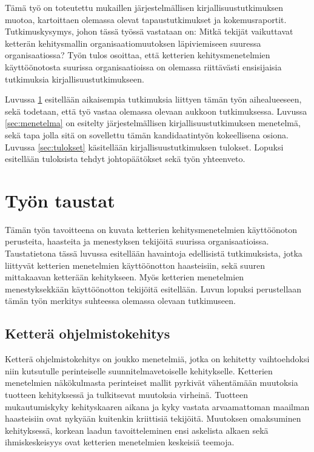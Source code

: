 Tämä työ on toteutettu mukaillen järjestelmällisen kirjallisuustutkimuksen
muotoa, kartoittaen olemassa olevat tapaustutkimukset ja kokemusraportit.
Tutkimuskysymys, johon tässä työssä vastataan on: Mitkä tekijät vaikuttavat
ketterän kehitysmallin organisaatiomuutoksen läpiviemiseen suuressa
organisaatiossa? Työn tulos osoittaa, että ketterien kehitysmenetelmien
käyttöönotosta suurissa organisaatioissa on olemassa riittävästi ensisijaisia
tutkimuksia kirjallisuustutkimukseen.

Luvussa \ref{sec:tausta} esitellään aikaisempia tutkimuksia liittyen tämän työn
aihealueeseen, sekä todetaan, että työ vastaa olemassa olevaan aukkoon
tutkimuksessa. Luvussa \ref{sec:menetelma} on esitelty järjestelmällisen
kirjallisuustutkimuksen menetelmä, sekä tapa jolla sitä on sovellettu tämän
kandidaatintyön kokeellisena osiona. Luvussa \ref{sec:tulokset} käsitellään
kirjallisuustutkimuksen tulokset. Lopuksi esitellään tuloksista tehdyt
johtopäätökset sekä työn yhteenveto.


\clearpage
\section{Työn taustat}
\label{sec:tausta}

Tämän työn tavoitteena on kuvata ketterien kehitysmenetelmien käyttöönoton
perusteita, haasteita ja menestyksen tekijöitä suurissa organisaatioissa.
Taustatietona tässä luvussa esitellään havaintoja edellisistä tutkimuksista,
jotka liittyvät ketterien menetelmien käyttöönotton haasteisiin, sekä suuren
mittakaavan ketterään kehitykseen. Myös ketterien menetelmien menestyksekkään
käyttöönotton tekijöitä esitellään. Luvun lopuksi perustellaan tämän työn
merkitys suhteessa olemassa olevaan tutkimuseen.

\subsection{Ketterä ohjelmistokehitys}

Ketterä ohjelmistokehitys on joukko menetelmiä, jotka on kehitetty vaihtoehdoksi
niin kutsutulle perinteiselle suunnitelmavetoiselle kehitykselle. Ketterien
menetelmien näkökulmasta perinteiset mallit pyrkivät vähentämään muutoksia
tuotteen kehityksessä ja tulkitsevat muutoksia virheinä. Tuotteen
mukautumiskyky kehityskaaren aikana ja kyky vastata arvaamattoman maailman
haasteisiin ovat nykyään kuitenkin kriittisiä tekijöitä. Muutoksen omaksuminen
kehityksessä, korkean laadun tavoitteleminen ensi askelista alkaen sekä
ihmiskeskeisyys ovat ketterien menetelmien keskeisiä teemoja.

